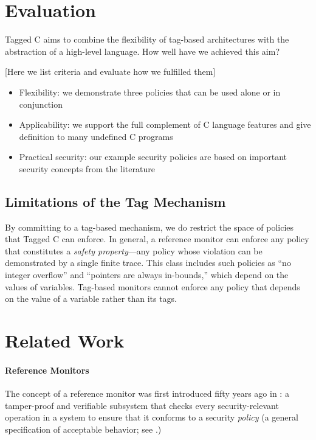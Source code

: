 \documentclass{llncs}
\begin{document}
\section{Evaluation}
\label{sec:evaluation}

Tagged C aims to combine the flexibility of tag-based architectures with the abstraction
of a high-level language. How well have we achieved this aim?

[Here we list criteria and evaluate how we fulfilled them]

\begin{itemize}
\item Flexibility: we demonstrate three policies that can be used alone or in conjunction
\item Applicability: we support the full complement of C language features and give definition
  to many undefined C programs
\item Practical security: our example security policies are based on important security concepts
  from the literature
\end{itemize}

\subsection{Limitations of the Tag Mechanism}

By committing to a tag-based mechanism, we do restrict the space of policies that Tagged C
can enforce. In general, a reference monitor can enforce any policy that constitutes a
{\em safety property}---any policy whose violation can be demonstrated by a single finite
trace. This class includes such policies as ``no integer overflow'' and ``pointers are always in-bounds,''
which depend on the values of variables. Tag-based monitors cannot enforce any policy that
depends on the value of a variable rather than its tags.

\section{Related Work}

\paragraph{Reference Monitors}

The concept of a reference monitor was first introduced fifty years ago in \cite{Anderson72:PlanningStudy}:
a tamper-proof and verifiable subsystem that checks every security-relevant operation in a system to
ensure that it conforms to a security {\em policy} (a general specification of acceptable behavior;
see \cite{Goguen82:SecurityPolicies}.)
\end{document}
